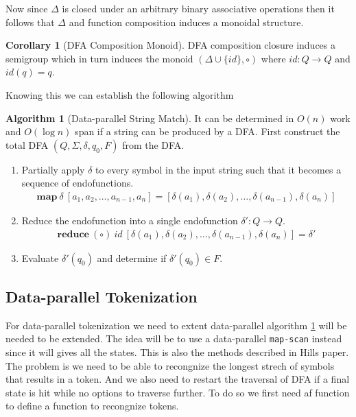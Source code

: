 \documentclass[a4paper,12pt]{article}
\theoremstyle{definition}
\newtheorem{corollary}{Corollary}[section]
\newtheorem{algorithm}{Algorithm}[section]
\begin{document}
\noindent Now since $\Delta$ is closed under an arbitrary binary associative operations then it follows that $\Delta$ and function composition induces a monoidal structure.

\begin{corollary}[DFA Composition Monoid]
  DFA composition closure induces a semigroup which in turn induces the monoid $(\Delta \cup \{id\}, \circ)$ where $id: Q \to Q$ and $id(q) = q$.
\end{corollary}
\noindent Knowing this we can establish the following algorithm
\begin{algorithm}[Data-parallel String Match]\label{algo:lex}
  It can be determined in $O(n)$ work and $O(\log n)$ span if a string can be produced by a DFA. First construct the total DFA $(Q, \Sigma, \delta, q_0, F)$ from the DFA.
  \begin{enumerate}
    \item Partially apply $\delta$ to every symbol in the input string such that it becomes a sequence of endofunctions.
    \begin{align*}
      \mathbf{map}\: \delta \: [a_1, a_2, \dots, a_{n - 1}, a_n] = [\delta(a_1), \delta(a_2), \dots, \delta(a_{n - 1}), \delta(a_n)]
    \end{align*}
    \item Reduce the endofunction into a single endofunction $\delta': Q \to Q$. \begin{align*}
      \mathbf{reduce} \: (\circ) \: id \: [\delta(a_1), \delta(a_2), \dots, \delta(a_{n - 1}), \delta(a_n)] = \delta'
    \end{align*}
    \item Evaluate $\delta'(q_0)$ and determine if $\delta'(q_0) \in F$.
  \end{enumerate}
\end{algorithm}

\subsection{Data-parallel Tokenization}
For data-parallel tokenization we need to extent data-parallel algorithm \ref{algo:lex} will be needed to be extended. The idea will be to use a data-parallel \texttt{map-scan} instead since it will gives all the states. This is also the methods described in Hills \cite{HILL1992699} paper. The problem is we need to be able to recongnize the longest strech of symbols that results in a token. And we also need to restart the traversal of DFA if a final state is hit while no options to traverse further. To do so we first need af function to define a function to recongnize tokens.
\end{document}
